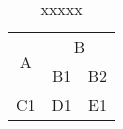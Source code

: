 

\usepackage{multirow}  %

\begin{table}[!ht]
    \centering
    \caption{xxxxx}
    \label{xxxxx}
    
    \begin{tabular}{|c|c|c|}
        \hline
        \multirow{2}{*}{A} & \multicolumn{2}{c|}{B} \\
        \cline{2-3}
        & B1 & B2 \\
        \hline
        C1 & D1 & E1 \\
        \hline
    \end{tabular}
\end{table}